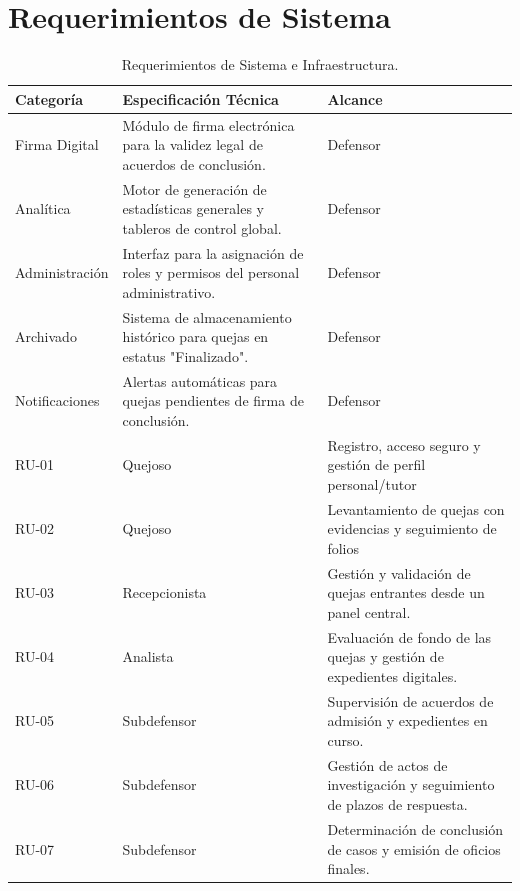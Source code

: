 \section{Requerimientos de Sistema}
\begin{table}[h!]
\centering
\caption{Requerimientos de Sistema e Infraestructura.}
\label{tab:sys_req}
\begin{tabular}{@{} p{3cm} p{8.5cm} l @{}}
\toprule
\rowcolor[HTML]{2D3E50} 
\textbf{\color[HTML]{FFFFFF} Categoría} & \textbf{\color[HTML]{FFFFFF} Especificación Técnica} & \textbf{\color[HTML]{FFFFFF} Alcance} \\ \midrule
\rowcolor[HTML]{F2F4F7} 
Firma Digital & Módulo de firma electrónica para la validez legal de acuerdos de conclusión. & Defensor \\
Analítica & Motor de generación de estadísticas generales y tableros de control global. & Defensor \\
\rowcolor[HTML]{F2F4F7} 
Administración & Interfaz para la asignación de roles y permisos del personal administrativo. & Defensor \\
Archivado & Sistema de almacenamiento histórico para quejas en estatus "Finalizado". & Defensor \\
\rowcolor[HTML]{F2F4F7} 
Notificaciones & Alertas automáticas para quejas pendientes de firma de conclusión. & Defensor \\ \bottomrule
RU-01 & Quejoso & Registro, acceso seguro y gestión de perfil personal/tutor\\
RU-02 & Quejoso & Levantamiento de quejas con evidencias y seguimiento de folios \\
\rowcolor[HTML]{F2F4F7} 
RU-03 & Recepcionista & Gestión y validación de quejas entrantes desde un panel central. \\
RU-04 & Analista & Evaluación de fondo de las quejas y gestión de expedientes digitales. \\
\rowcolor[HTML]{F2F4F7} 
RU-05 & Subdefensor & Supervisión de acuerdos de admisión y expedientes en curso. \\
RU-06 & Subdefensor & Gestión de actos de investigación y seguimiento de plazos de respuesta. \\
\rowcolor[HTML]{F2F4F7} 
RU-07 & Subdefensor & Determinación de conclusión de casos y emisión de oficios finales. \\ \bottomrule
\end{tabular}
\end{table}